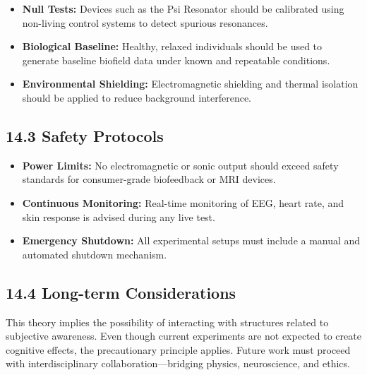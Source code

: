 \begin{itemize}
  \item \textbf{Null Tests:} Devices such as the Psi Resonator should be calibrated using non-living control systems to detect spurious resonances.
  \item \textbf{Biological Baseline:} Healthy, relaxed individuals should be used to generate baseline biofield data under known and repeatable conditions.
  \item \textbf{Environmental Shielding:} Electromagnetic shielding and thermal isolation should be applied to reduce background interference.
\end{itemize}

\subsection*{14.3 Safety Protocols}

\begin{itemize}
  \item \textbf{Power Limits:} No electromagnetic or sonic output should exceed safety standards for consumer-grade biofeedback or MRI devices.
  \item \textbf{Continuous Monitoring:} Real-time monitoring of EEG, heart rate, and skin response is advised during any live test.
  \item \textbf{Emergency Shutdown:} All experimental setups must include a manual and automated shutdown mechanism.
\end{itemize}

\subsection*{14.4 Long-term Considerations}

This theory implies the possibility of interacting with structures related to subjective awareness. Even though current experiments are not expected to create cognitive effects, the precautionary principle applies. Future work must proceed with interdisciplinary collaboration—bridging physics, neuroscience, and ethics.


